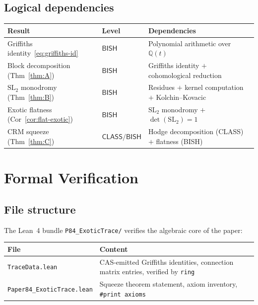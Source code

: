 \documentclass[11pt]{article}
\theoremstyle{plain}
\theoremstyle{definition}
\theoremstyle{remark}
\newcommand{\Q}{\mathbb{Q}}
\newcommand{\SL}{\mathrm{SL}}
\newcommand{\BISH}{\ensuremath{\mathsf{BISH}}}
\newcommand{\CLASS}{\ensuremath{\mathsf{CLASS}}}
\begin{document}
\subsection{Logical dependencies}

\begin{center}
\begin{tabular}{llp{5.5cm}}
\toprule
\textbf{Result} & \textbf{Level} & \textbf{Dependencies} \\
\midrule
Griffiths identity~\eqref{eq:griffiths-id} & $\BISH$ &
  Polynomial arithmetic over $\Q(t)$ \\
Block decomposition (Thm~\ref{thm:A}) & $\BISH$ &
  Griffiths identity $+$ cohomological reduction \\
$\SL_2$ monodromy (Thm~\ref{thm:B}) & $\BISH$ &
  Residues $+$ kernel computation $+$ Kolchin--Kovacic \\
Exotic flatness (Cor~\ref{cor:flat-exotic}) & $\BISH$ &
  $\SL_2$ monodromy $+$ $\det(\SL_2) = 1$ \\
CRM squeeze (Thm~\ref{thm:C}) & $\CLASS / \BISH$ &
  Hodge decomposition (CLASS) $+$ flatness (BISH) \\
\bottomrule
\end{tabular}
\end{center}

\section{Formal Verification}\label{sec:lean}

\subsection{File structure}

The Lean~4 bundle \texttt{P84\_ExoticTrace/} verifies the algebraic
core of the paper:

\begin{center}
\begin{tabular}{lp{6cm}}
\toprule
\textbf{File} & \textbf{Content} \\
\midrule
\texttt{TraceData.lean} & CAS-emitted Griffiths identities,
  connection matrix entries, verified by \texttt{ring} \\
\texttt{Paper84\_ExoticTrace.lean} & Squeeze theorem statement,
  axiom inventory, \texttt{\#print axioms} \\
\bottomrule
\end{tabular}
\end{center}
\end{document}
